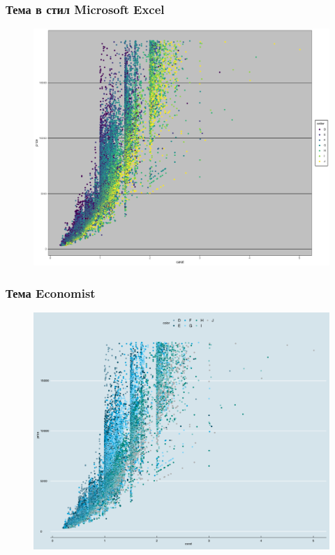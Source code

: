 \documentclass{beamer}
\begin{document}
\begin{frame}
\frametitle{Тема в стил Microsoft Excel}
\begin{figure}[]\includegraphics[width=\textwidth,height=0.75\textheight]{pic0045}\end{figure}
\end{frame}

\begin{frame}
\frametitle{Тема Economist}
\begin{figure}[]\includegraphics[width=\textwidth,height=0.75\textheight]{pic0046}\end{figure}
\end{frame}
\end{document}
